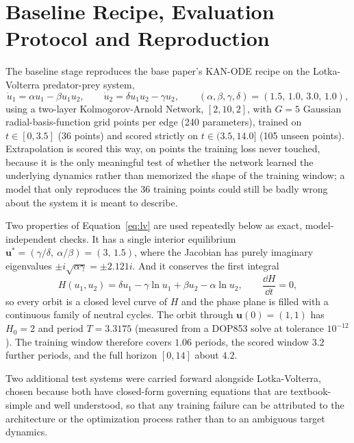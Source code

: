 \section{Baseline Recipe, Evaluation Protocol and Reproduction}
\label{sec:phase1}

The baseline stage reproduces the base paper's KAN-ODE recipe
\cite{Koenig_2024} on the Lotka-Volterra predator-prey system,
\begin{equation}
\dot u_1 = \alpha u_1 - \beta u_1 u_2, \qquad \dot u_2 = \delta u_1 u_2 - \gamma u_2,
\qquad (\alpha,\beta,\gamma,\delta) = (1.5,\,1.0,\,3.0,\,1.0),
\label{eq:lv}
\end{equation}
using a two-layer Kolmogorov-Arnold Network, $[2,10,2]$, with $G=5$
Gaussian radial-basis-function grid points per edge (240 parameters),
trained on $t\in[0,3.5]$ (36 points) and scored strictly on $t\in(3.5,14.0]$
(105 unseen points). Extrapolation is scored this way, on points the training
loss never touched, because it is the only meaningful test of whether the
network learned the underlying dynamics rather than memorized the shape of
the training window; a model that only reproduces the 36 training points
could still be badly wrong about the system it is meant to describe.

Two properties of Equation~\ref{eq:lv} are used repeatedly below as exact,
model-independent checks. It has a single interior equilibrium
$\mathbf{u}^\ast=(\gamma/\delta,\ \alpha/\beta)=(3,\,1.5)$, where the
Jacobian has purely imaginary eigenvalues $\pm i\sqrt{\alpha\gamma}=\pm2.121i$.
And it conserves the first integral
\begin{equation}
H(u_1,u_2)=\delta u_1-\gamma\ln u_1+\beta u_2-\alpha\ln u_2,
\qquad \frac{\dd H}{\dd t}=0,
\label{eq:lv-invariant}
\end{equation}
so every orbit is a closed level curve of $H$ and the phase plane is filled
with a continuous family of neutral cycles. The orbit through
$\mathbf{u}(0)=(1,1)$ has $H_0=2$ and period $T=3.3175$ (measured from a
DOP853 solve at tolerance $10^{-12}$). The training window therefore covers
$1.06$ periods, the scored window $3.2$ further periods, and the full
horizon $[0,14]$ about $4.2$.

Two additional test systems were carried forward alongside Lotka-Volterra,
chosen because both have closed-form governing equations that are
textbook-simple and well understood, so that any training failure can be
attributed to the architecture or the optimization process rather than to an
ambiguous target dynamics.

